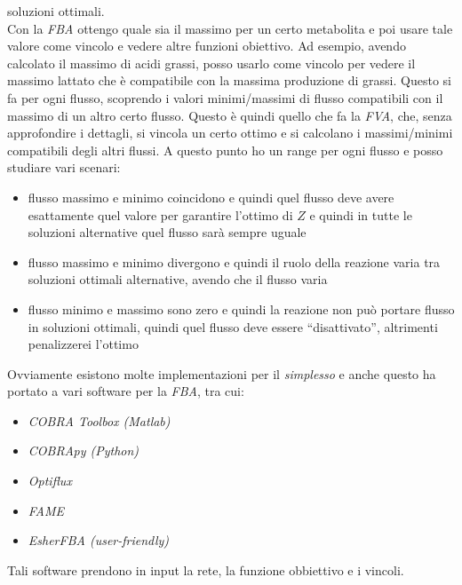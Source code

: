 \documentclass[a4paper,12pt, oneside]{book}
\begin{document}
soluzioni ottimali.\\
Con la \textit{FBA} ottengo quale sia il massimo per un
certo metabolita e poi usare tale valore come vincolo e vedere altre funzioni
obiettivo. Ad esempio, avendo calcolato il massimo di acidi grassi, posso usarlo
come vincolo per vedere il massimo lattato che è compatibile con la massima
produzione di grassi. Questo si fa per ogni flusso, scoprendo i valori
minimi/massimi di flusso compatibili con il massimo di un altro certo
flusso. Questo è quindi quello che fa la \textit{FVA}, che, senza approfondire i
dettagli, si vincola un certo ottimo e si calcolano i massimi/minimi compatibili
degli altri flussi. A questo punto ho un range per ogni flusso e posso studiare
vari scenari:
\begin{itemize}
  \item flusso massimo e minimo coincidono e quindi quel flusso deve avere
  esattamente quel valore per garantire l'ottimo di $Z$ e quindi in tutte le
  soluzioni alternative quel flusso sarà sempre uguale
  \item flusso massimo e minimo divergono e quindi il ruolo della reazione varia
  tra soluzioni ottimali alternative, avendo che il flusso varia
  \item flusso minimo e massimo sono zero e quindi la reazione non può portare
  flusso in soluzioni ottimali, quindi quel flusso deve essere ``disattivato'',
  altrimenti penalizzerei l'ottimo
\end{itemize}
Ovviamente esistono molte implementazioni per il \textit{simplesso} e anche
questo ha portato a vari software per la \textit{FBA}, tra cui:
\begin{multicols}{2}
  \begin{itemize}
    \item \textit{COBRA Toolbox (Matlab)}
    \item \textit{COBRApy (Python)}
    \item \textit{Optiflux}
    \item \textit{FAME}
    \item \textit{EsherFBA (user-friendly)}
  \end{itemize}
\end{multicols}
Tali software prendono in input la rete, la funzione obbiettivo e i vincoli.
\end{document}
